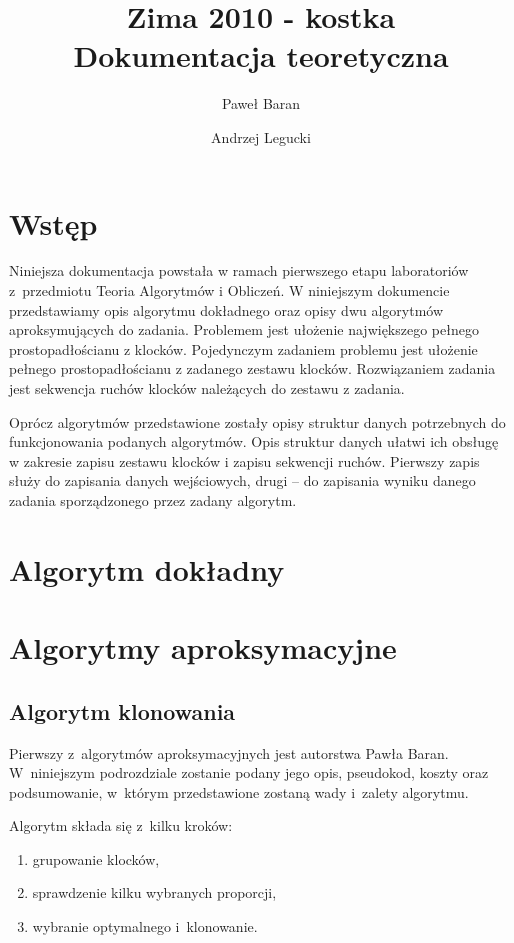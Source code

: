 \documentclass[12pt]{article}
\title{
\Huge{
Zima 2010 - kostka
} \\[0.5em]
\LARGE{
Dokumentacja teoretyczna
}
}
\author{
	Paweł Baran \and Andrzej Legucki
}
\begin{document}
\maketitle

\newpage

\tableofcontents

\newpage
\section{Wstęp}
Niniejsza dokumentacja powstała w ramach pierwszego etapu laboratoriów
z~przedmiotu Teoria Algorytmów i Obliczeń. W niniejszym dokumencie
przedstawiamy opis algorytmu dokładnego oraz opisy dwu algorytmów
aproksymujących do zadania. Problemem jest ułożenie największego
pełnego prostopadłościanu z klocków. Pojedynczym zadaniem problemu jest
ułożenie pełnego prostopadłościanu z zadanego zestawu klocków.
Rozwiązaniem zadania jest sekwencja ruchów klocków należących do zestawu
z zadania.

Oprócz algorytmów przedstawione zostały opisy struktur danych potrzebnych
do funkcjonowania podanych algorytmów. Opis struktur danych ułatwi ich
obsługę w zakresie zapisu zestawu klocków i zapisu sekwencji ruchów.
Pierwszy zapis służy do zapisania danych wejściowych, drugi -- do zapisania
wyniku danego zadania sporządzonego przez zadany algorytm.

\section{Algorytm dokładny}

\section{Algorytmy aproksymacyjne}

\subsection{Algorytm klonowania}
Pierwszy z~algorytmów aproksymacyjnych jest autorstwa Pawła Baran.
W~niniejszym podrozdziale zostanie podany jego opis, pseudokod, koszty oraz
podsumowanie, w~którym przedstawione zostaną wady i~zalety algorytmu.

Algorytm składa się z~kilku kroków:
\begin{enumerate}
	\item grupowanie klocków,
	\item sprawdzenie kilku wybranych proporcji,
	\item wybranie optymalnego i~klonowanie.
\end{enumerate}
\end{document}
